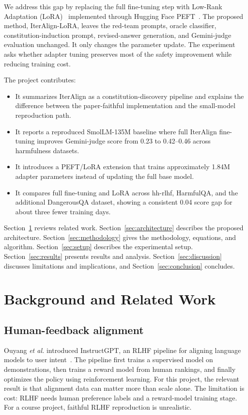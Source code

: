 \documentclass[10pt,twocolumn]{article}
\newcommand{\method}{IterAlign-LoRA}
\newcommand{\modelname}{SmolLM-135M}
\newcommand{\dataset}{DangerousQA}
\newcommand{\etal}{\textit{et al.}}
\begin{document}
We address this gap by replacing the full fine-tuning step with Low-Rank Adaptation (LoRA)~\cite{hu2022lora} implemented through Hugging Face PEFT~\cite{peft2022}. The proposed method, \method, leaves the red-team prompts, oracle classifier, constitution-induction prompt, revised-answer generation, and Gemini-judge evaluation unchanged. It only changes the parameter update. The experiment asks whether adapter tuning preserves most of the safety improvement while reducing training cost.

The project contributes:
\begin{itemize}
  \item It summarizes IterAlign as a constitution-discovery pipeline and explains the difference between the paper-faithful implementation and the small-model reproduction path.
  \item It reports a reproduced \modelname{} baseline where full IterAlign fine-tuning improves Gemini-judge score from 0.23 to 0.42--0.46 across harmfulness datasets.
  \item It introduces a PEFT/LoRA extension that trains approximately 1.84M adapter parameters instead of updating the full base model.
  \item It compares full fine-tuning and LoRA across hh-rlhf, HarmfulQA, and the additional \dataset{} dataset, showing a consistent 0.04 score gap for about three fewer training days.
\end{itemize}

Section~\ref{sec:related} reviews related work. Section~\ref{sec:architecture} describes the proposed architecture. Section~\ref{sec:methodology} gives the methodology, equations, and algorithm. Section~\ref{sec:setup} describes the experimental setup. Section~\ref{sec:results} presents results and analysis. Section~\ref{sec:discussion} discusses limitations and implications, and Section~\ref{sec:conclusion} concludes.

\section{Background and Related Work}
\label{sec:related}

\subsection{Human-feedback alignment}
Ouyang \etal{} introduced InstructGPT, an RLHF pipeline for aligning language models to user intent~\cite{ouyang2022instructgpt}. The pipeline first trains a supervised model on demonstrations, then trains a reward model from human rankings, and finally optimizes the policy using reinforcement learning. For this project, the relevant result is that alignment data can matter more than scale alone. The limitation is cost: RLHF needs human preference labels and a reward-model training stage. For a course project, faithful RLHF reproduction is unrealistic.
\end{document}
